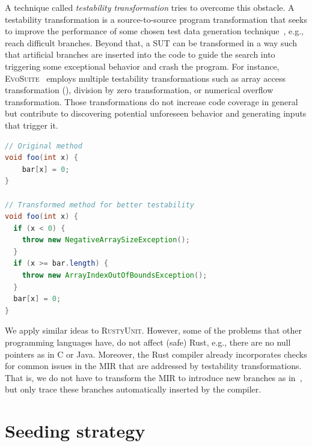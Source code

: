 \documentclass[paper=a4,%
  twoside,%
  BCOR4mm,%
  abstract=true,%
  toc=bibliography,%
  chapterprefix=true,%
  toc=bibliographynumbered,%
  open=right,%
  english,%
  pagesize=pdftex]{scrreprt}
\newcommand{\tech}{\textsc{RustyUnit}\xspace}
\newcommand{\mir}{\ac{MIR}\xspace}
\newcommand{\sut}{\ac{SUT}\xspace}
\begin{document}
A technique called \emph{testability transformation} tries to overcome this obstacle. A testability transformation is a source-to-source program transformation that seeks to improve the performance of some chosen test data generation technique~\cite{Harman2004}, e.g., reach difficult branches. Beyond that, a \sut can be transformed in a way such that artificial branches are inserted into the code to guide the search into triggering some exceptional behavior and crash the program. For instance, \textsc{EvoSuite}~\cite{Fraser2013} employs multiple testability transformations such as array access transformation (), division by zero transformation, or numerical overflow transformation. Those transformations do not increase code coverage in general but contribute to discovering potential unforeseen behavior and generating inputs that trigger it.

\begin{lstlisting}[language=Java, style=boxed, caption={Array access transformation in \textsc{EvoSuite} for Java}, label=lst:evosuite-array-access-transformation]
// Original method
void foo(int x) {
    bar[x] = 0;
}

// Transformed method for better testability
void foo(int x) {
  if (x < 0) {
    throw new NegativeArraySizeException();
  }
  if (x >= bar.length) {
    throw new ArrayIndexOutOfBoundsException();
  }
  bar[x] = 0;
}
\end{lstlisting}

We apply similar ideas to \tech. However, some of the problems that other programming languages have, do not affect (safe) Rust, e.g., there are no null pointers as in C or Java. Moreover, the Rust compiler already incorporates checks for common issues in the \mir that are addressed by testability transformations. That is, we do not have to transform the \mir to introduce new branches as in~, but only trace these branches automatically inserted by the compiler. 

\section{Seeding strategy}
\label{sec:seeding-strategy}
\end{document}
